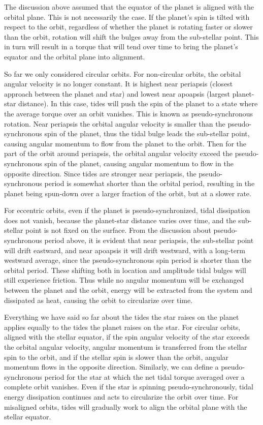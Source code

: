 The discussion above assumed that the equator of the planet is aligned with the
orbital plane. This is not necessarily the case. If the planet's spin is tilted
with respect to the orbit, regardless of whether the planet is rotating faster
or slower than the orbit, rotation will shift the bulges away from the
sub-stellar point. This in turn will result in a torque that will tend over time
to bring the planet's equator and the orbital plane into alignment.

So far we only considered circular orbits. For non-circular orbits, the orbital
angular velocity is no longer constant. It is highest near periapsis (closest
approach between the planet and star) and lowest near apoapsis (largest
planet-star distance). In this case, tides will push the spin of the planet to a
state where the average torque over an orbit vanishes. This is known as
pseudo-synchronous rotation. Near periapsis the orbital angular velocity is
smaller than the pseudo-synchronous spin of the planet, thus the tidal bulge
leads the sub-stellar point, causing angular momentum to flow from the planet to
the orbit. Then for the part of the orbit around periapsis, the orbital angular
velocity exceed the pseudo-synchronous spin of the planet, causing angular
momentum to flow in the opposite direction. Since tides are stronger near
periapsis, the pseudo-synchronous period is somewhat shorter than the orbital
period, resulting in the planet being spun-down over a larger fraction of the
orbit, but at a slower rate.

For eccentric orbits, even if the planet is pseudo-synchronized, tidal
dissipation does not vanish, because the planet-star distance varies over time,
and the sub-stellar point is not fixed on the surface. From the discussion about
pseudo-synchronous period above, it is evident that near periapsis, the
sub-stellar point will drift eastward, and near apoapsis it will drift westward,
with a long-term westward average, since the pseudo-synchronous spin period is
shorter than the orbital period. These shifting both in location and amplitude
tidal bulges will still experience friction. Thus while no angular momentum will
be exchanged between the planet and the orbit, energy will be extracted from
the system and dissipated as heat, causing the orbit to circularize over time.

Everything we have said so far about the tides the star raises on the planet
applies equally to the tides the planet raises on the star. For circular orbits,
aligned with the stellar equator, if the spin angular velocity of the star
exceeds the orbital angular velocity, angular momentum is transferred from the
stellar spin to the orbit, and if the stellar spin is slower than the orbit,
angular momentum flows in the opposite direction. Similarly, we can define a
pseudo-synchronous period for the star at which the net tidal torque averaged
over a complete orbit vanishes. Even if the star is spinning
pseudo-synchronously, tidal energy dissipation continues and acts to circularize
the orbit over time. For misaligned orbits, tides will gradually work to align
the orbital plane with the stellar equator.

